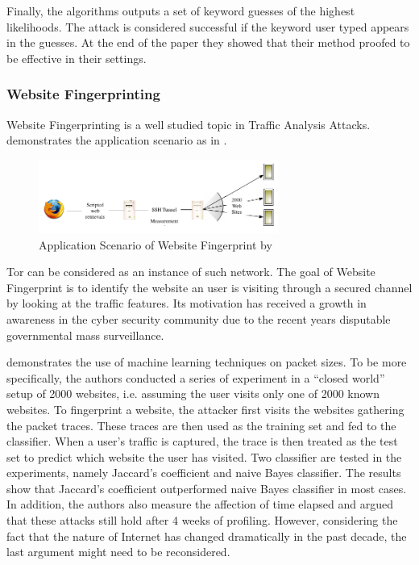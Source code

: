 Finally, the algorithms outputs a set of keyword guesses of the highest likelihoods. The attack is considered successful if the keyword user typed appears in the guesses. At the end of the paper they showed that their method proofed to be effective in their settings.

\subsubsection{Website Fingerprinting}
Website Fingerprinting is a well studied topic in Traffic Analysis Attacks. \cite{WebsiteFingerprint} demonstrates the application scenario as in . 

\begin{figure}[h!]
	\centering
	\includegraphics[width=0.7\textwidth]{fig/WebsiteFingerprint.png}
	\caption{Application Scenario of Website Fingerprint by \cite{WebsiteFingerprint}}
	\label{Fig: Application Scenario of Website Fingerprint}
\end{figure}

Tor\cite{Tor} can be considered as an instance of such network. The goal of Website Fingerprint is to identify the website an user is visiting through a secured channel by looking at the traffic features. Its motivation has received a growth in awareness in the cyber security community due to the recent years disputable governmental mass surveillance.

\cite{WebsiteFingerprint} demonstrates the use of machine learning techniques on packet sizes. To be more specifically, the authors conducted a series of experiment in a ``closed world'' setup of 2000 websites, i.e. assuming the user visits only one of 2000 known websites. To fingerprint a website, the attacker first visits the websites gathering the packet traces. These traces are then used as the training set and fed to the classifier. When a user's traffic is captured, the trace is then treated as the test set to predict which website the user has visited. Two classifier are tested in the experiments, namely Jaccard's coefficient and naive Bayes classifier. The results show that Jaccard's coefficient outperformed naive Bayes classifier in most cases. In addition, the authors also measure the affection of time elapsed and argued that these attacks still hold after 4 weeks of profiling. However, considering the fact that the nature of Internet has changed dramatically in the past decade, the last argument might need to be reconsidered.

